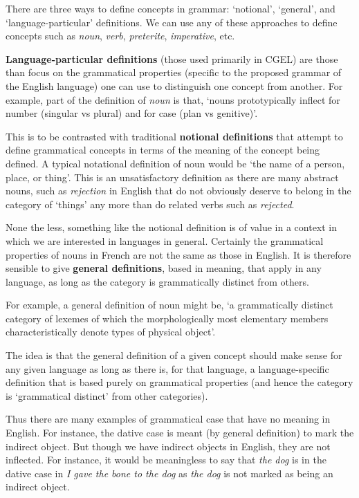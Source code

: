 \documentclass{scrarticle}
\begin{document}
There are three ways to define concepts in grammar: `notional', `general', and `language-particular'
definitions. We can use any of these approaches to define concepts such as \emph{noun}, \emph{verb},
\emph{preterite}, \emph{imperative}, etc. 

\textbf{Language-particular definitions} (those used primarily in CGEL) are those than focus on the
grammatical properties (specific to the proposed grammar of the English language) one can use to
distinguish one concept from another. For example, part of the definition of \emph{noun} is that,
`nouns prototypically inflect for number (singular vs plural) and for case (plan vs genitive)'.

This is to be contrasted with traditional \textbf{notional definitions} that attempt to define
grammatical concepts in terms of the meaning of the concept being defined. A typical notational
definition of noun would be `the name of a person, place, or thing'. This is an unsatisfactory
definition as there are many abstract nouns, such as \emph{rejection} in English that do not
obviously deserve to belong in the category of `things' any more than do related verbs such as
\emph{rejected}.

None the less, something like the notional definition is of value in a context in which we are
interested in languages in general. Certainly the grammatical properties of nouns in French are not
the same as those in English. It is therefore sensible to give \textbf{general definitions}, based in
meaning, that apply in any language, as long as the category is grammatically distinct from others.

For example, a general definition of noun might be, `a grammatically distinct category of lexemes of
which the morphologically most elementary members characteristically denote types of physical
object'.

The idea is that the general definition of a given concept should make sense for any given language
as long as there is, for that language, a language-specific definition that is based purely on
grammatical properties (and hence the category is `grammatical distinct' from other categories).

Thus there are many examples of grammatical case that have no meaning in English. For instance, the
dative case is meant (by general definition) to mark the indirect object. But though we have
indirect objects in English, they are not inflected. For instance, it would be meaningless to say
that \emph{the dog} is in the dative case in \emph{I gave the bone to the dog} as \emph{the dog} is
not marked as being an indirect object.
\end{document}
